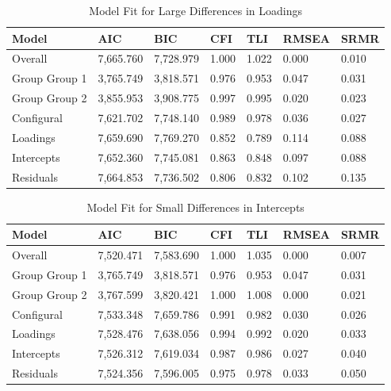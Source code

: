 \documentclass[
  man,floatsintext]{apa7}
\begin{document}
\begin{table}[tbp]

\begin{center}
\begin{threeparttable}

\caption{\label{tab:tab4}Model Fit for Large Differences in Loadings}

\begin{tabular}{lllllll}
\toprule
Model & AIC & BIC & CFI & TLI & RMSEA & SRMR\\
\midrule
Overall & 7,665.760 & 7,728.979 & 1.000 & 1.022 & 0.000 & 0.010\\
Group Group 1 & 3,765.749 & 3,818.571 & 0.976 & 0.953 & 0.047 & 0.031\\
Group Group 2 & 3,855.953 & 3,908.775 & 0.997 & 0.995 & 0.020 & 0.023\\
Configural & 7,621.702 & 7,748.140 & 0.989 & 0.978 & 0.036 & 0.027\\
Loadings & 7,659.690 & 7,769.270 & 0.852 & 0.789 & 0.114 & 0.088\\
Intercepts & 7,652.360 & 7,745.081 & 0.863 & 0.848 & 0.097 & 0.088\\
Residuals & 7,664.853 & 7,736.502 & 0.806 & 0.832 & 0.102 & 0.135\\
\bottomrule
\end{tabular}

\end{threeparttable}
\end{center}

\end{table}

\begin{table}[tbp]

\begin{center}
\begin{threeparttable}

\caption{\label{tab:tab5}Model Fit for Small Differences in Intercepts}

\begin{tabular}{lllllll}
\toprule
Model & AIC & BIC & CFI & TLI & RMSEA & SRMR\\
\midrule
Overall & 7,520.471 & 7,583.690 & 1.000 & 1.035 & 0.000 & 0.007\\
Group Group 1 & 3,765.749 & 3,818.571 & 0.976 & 0.953 & 0.047 & 0.031\\
Group Group 2 & 3,767.599 & 3,820.421 & 1.000 & 1.008 & 0.000 & 0.021\\
Configural & 7,533.348 & 7,659.786 & 0.991 & 0.982 & 0.030 & 0.026\\
Loadings & 7,528.476 & 7,638.056 & 0.994 & 0.992 & 0.020 & 0.033\\
Intercepts & 7,526.312 & 7,619.034 & 0.987 & 0.986 & 0.027 & 0.040\\
Residuals & 7,524.356 & 7,596.005 & 0.975 & 0.978 & 0.033 & 0.050\\
\bottomrule
\end{tabular}

\end{threeparttable}
\end{center}

\end{table}
\end{document}
